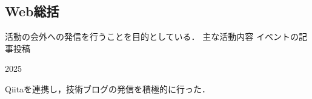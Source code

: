 \subsection*{Web総括}


活動の会外への発信を行うことを目的としている．
主な活動内容
    イベントの記事投稿

2025

Qiitaを連携し，技術ブログの発信を積極的に行った．
